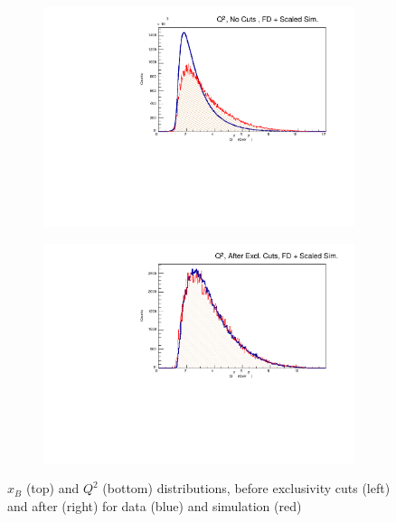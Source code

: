 \begin{figure}[!htb]
\begin{subfigure}{.45\textwidth}
            \end{subfigure}
            \begin{subfigure}{.45\textwidth}
                \centering
                \includegraphics[width=1\textwidth]{figures/Simulation/kinematics_advanced/hist_q2_nocut_fd_Double.pdf}
            \end{subfigure}%
            \begin{subfigure}{.45\textwidth}
                \centering
                \includegraphics[width=1\textwidth]{figures/Simulation/kinematics_advanced/hist_q2_excut_fd_Double.pdf}
            \end{subfigure}
            \caption[short]{$x_B$ (top) and $Q^2$ (bottom) distributions, before exclusivity cuts (left) and after (right) for data (blue) and simulation (red)}
        \end{figure}
        
